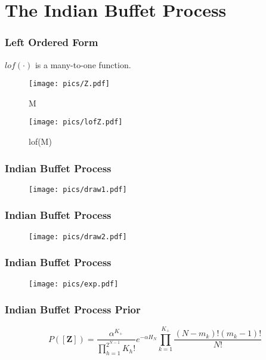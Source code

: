 \documentclass{beamer}
\begin{document}
  \section{The Indian Buffet Process}
  \begin{frame}
  \frametitle{Left Ordered Form}
    $lof(\cdot)$ is a many-to-one function.

    \begin{figure}
      \centering
      \begin{minipage}{.5\textwidth}
        \centering
        \texttt{[image: pics/Z.pdf]}
        \caption{M}
      \end{minipage}%
      \begin{minipage}{.5\textwidth}
        \centering
        \texttt{[image: pics/lofZ.pdf]}
        \caption{lof(M)}
      \end{minipage}
    \end{figure}  

  \end{frame}

  \begin{frame}
  \frametitle{Indian Buffet Process}
    \begin{center}\begin{figure}
      \texttt{[image: pics/draw1.pdf]}
    \end{figure}\end{center}  
  \end{frame}

  \begin{frame}
  \frametitle{Indian Buffet Process}
    \begin{center}\begin{figure}
      \texttt{[image: pics/draw2.pdf]}
    \end{figure}\end{center}  
  \end{frame}

  \begin{frame}
  \frametitle{Indian Buffet Process}
    \begin{center}\begin{figure}
      \texttt{[image: pics/exp.pdf]}
    \end{figure}\end{center}  
  \end{frame}

  \begin{frame}
  \frametitle{Indian Buffet Process Prior}
    \[
      P([\bm Z]) = \frac{\alpha^{K_+}}{\prod_{h=1}^{2^{N-1}}K_h!} e^{-\alpha H_N} 
                   \prod_{k=1}^{K_+} \frac{(N-m_k)!(m_k-1)!}{N!}
    \]
  \end{frame}
\end{document}
